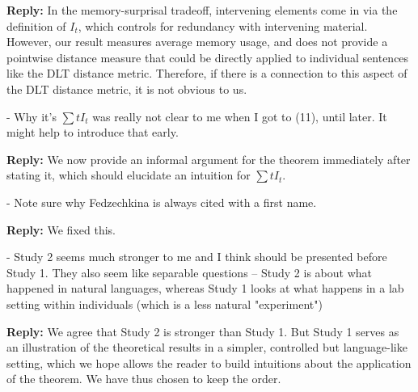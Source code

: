 \documentclass{article}[11pt,a4paper,oneside]
\newcommand\mhahn[1]{\textcolor{red}{[mhahn: #1]}}
\newcommand\rljf[1]{\textcolor{green}{[rljf: #1]}}
\newenvironment{reply}
  {\par\medskip
   \color{blue}%
   \begin{framed}
   \textbf{Reply: }\ignorespaces}
 {\end{framed}
  \medskip}
\begin{document}
\begin{reply}
In the memory-surprisal tradeoff, intervening elements come in via the definition of $I_t$, which controls for redundancy with intervening material.
However, our result measures average memory usage, and does not provide a pointwise distance measure that could be directly applied to individual sentences like the DLT distance metric.
Therefore, if there is a connection to this aspect of the DLT distance metric, it is not obvious to us.
%
%
%
%	
%
\end{reply}

- Why it's $\sum t I_t$ was really not clear to me when I got to (11), until later. It might help to introduce that early.

\begin{reply}
We now provide an informal argument for the theorem immediately after stating it, which should elucidate an intuition for $\sum t I_t$.
\end{reply}

- Note sure why Fedzechkina is always cited with a first name.

\begin{reply}
	We fixed this.
\end{reply}

- Study 2 seems much stronger to me and I think should be presented before Study 1. They also seem like separable questions -- Study 2 is about what happened in natural languages, whereas Study 1 looks at what happens in a lab setting within individuals (which is a less natural "experiment")

\begin{reply}
We agree that Study 2 is stronger than Study 1. But Study 1 serves as an illustration of the theoretical results in a simpler, controlled but language-like setting, which we hope allows the reader to build intuitions about the application of the theorem. We have thus chosen to keep the order.
	
\end{reply}
\end{document}
